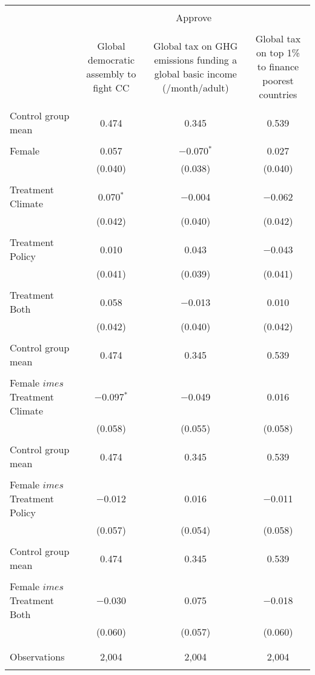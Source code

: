 
\begin{tabular}{@{\extracolsep{5pt}}lccc} 
\\[-1.8ex]\hline 
\hline \\[-1.8ex] 
 & \multicolumn{3}{c}{Approve} \\ 
\cline{2-4} 
\\[-1.8ex] & Global democratic assembly to fight CC & Global tax on GHG emissions funding a global basic income (\textdollar 30/month/adult) & Global tax on top 1\% to finance poorest countries \\ 
\hline \\[-1.8ex] 
 Control group mean & 0.474 & 0.345 & 0.539  \\ \hline \\[-1.8ex] Female & 0.057 & $-$0.070$^{*}$ & 0.027 \\ 
  & (0.040) & (0.038) & (0.040) \\ 
  & & & \\ 
 Treatment Climate & 0.070$^{*}$ & $-$0.004 & $-$0.062 \\ 
  & (0.042) & (0.040) & (0.042) \\ 
  & & & \\ 
 Treatment Policy & 0.010 & 0.043 & $-$0.043 \\ 
  & (0.041) & (0.039) & (0.041) \\ 
  & & & \\ 
 Treatment Both & 0.058 & $-$0.013 & 0.010 \\ 
  & (0.042) & (0.040) & (0.042) \\ 
  & & & \\ 
 Control group mean & 0.474 & 0.345 & 0.539  \\ \hline \\[-1.8ex] Female $	imes$ Treatment Climate & $-$0.097$^{*}$ & $-$0.049 & 0.016 \\ 
  & (0.058) & (0.055) & (0.058) \\ 
  & & & \\ 
 Control group mean & 0.474 & 0.345 & 0.539  \\ \hline \\[-1.8ex] Female $	imes$ Treatment Policy & $-$0.012 & 0.016 & $-$0.011 \\ 
  & (0.057) & (0.054) & (0.058) \\ 
  & & & \\ 
 Control group mean & 0.474 & 0.345 & 0.539  \\ \hline \\[-1.8ex] Female $	imes$ Treatment Both & $-$0.030 & 0.075 & $-$0.018 \\ 
  & (0.060) & (0.057) & (0.060) \\ 
  & & & \\ 
\hline \\[-1.8ex] 

Observations & 2,004 & 2,004 & 2,004 \\ 
\hline 
\hline \\[-1.8ex] 
\end{tabular} 